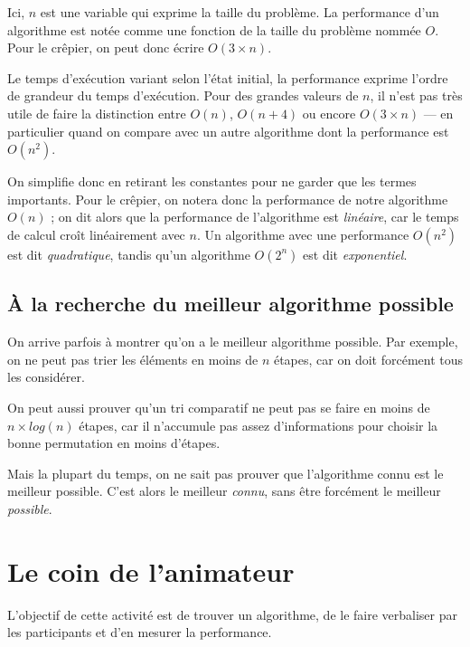 \documentclass[a5paper,pagesize,DIV=14]{scrbook}
\begin{document}
Ici, $n$ est une variable qui exprime la taille du problème. La performance d'un
algorithme est notée comme une fonction de la taille du problème nommée
$O$. Pour le crêpier, on peut donc écrire $O(3 \times n)$.

Le temps d'exécution variant selon l'état initial, la performance exprime
l'ordre de grandeur du temps d'exécution. Pour des grandes valeurs de $n$, il
n'est pas très utile de faire la distinction entre $O(n)$, $O(n+4)$ ou encore
$O(3 \times n)$ --- en particulier quand on compare avec un autre algorithme
dont la performance est $O(n^2)$.

On simplifie donc en retirant les constantes pour ne garder que les termes
importants. Pour le crêpier, on notera donc la performance de notre algorithme
$O(n)$ ; on dit alors que la performance de l'algorithme est \textit{linéaire},
car le temps de calcul croît linéairement avec $n$. Un algorithme avec une
performance $O(n^2)$ est dit \textit{quadratique}, tandis qu'un algorithme
$O(2^n)$ est dit \textit{exponentiel}.

\subsection*{À la recherche du meilleur algorithme possible}

On arrive parfois à montrer qu'on a le meilleur algorithme possible. Par
exemple, on ne peut pas trier les éléments en moins de $n$ étapes, car on doit
forcément tous les considérer.

On peut aussi prouver qu'un tri comparatif ne peut pas se faire en moins de
$n\times log(n)$ étapes, car il n'accumule pas assez d'informations pour choisir
la bonne permutation en moins d'étapes.

Mais la plupart du temps, on ne sait pas prouver que l'algorithme connu est le
meilleur possible. C'est alors le meilleur \textit{connu}, sans être forcément
le meilleur \textit{possible}.
    
\section*{Le coin de l'animateur}

L'objectif de cette activité est de trouver un algorithme, de le faire
verbaliser par les participants et d'en mesurer la performance.
\end{document}
